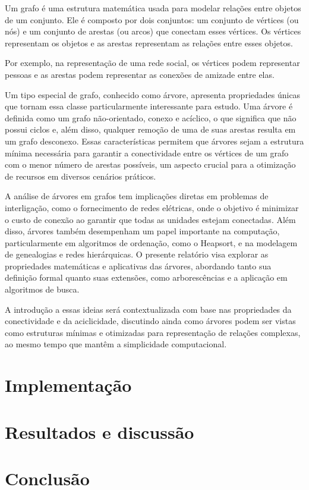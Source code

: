 \documentclass[12pt, a4paper]{scrreprt}
\begin{document}
Um grafo é uma estrutura matemática usada para modelar relações entre objetos de um conjunto. Ele é composto por dois conjuntos: um conjunto de vértices (ou nós) e um conjunto de arestas (ou arcos) que conectam esses vértices. Os vértices representam os objetos e as arestas representam as relações entre esses objetos.\cite{emilio2024grafos}

Por exemplo, na representação de uma rede social, os vértices podem representar pessoas e as arestas podem representar as conexões de amizade entre elas.

Um tipo especial de grafo, conhecido como árvore, apresenta propriedades únicas que tornam essa classe particularmente interessante para estudo. Uma árvore é definida como um grafo não-orientado, conexo e acíclico, o que significa que não possui ciclos e, além disso, qualquer remoção de uma de suas arestas resulta em um grafo desconexo. Essas características permitem que árvores sejam a estrutura mínima necessária para garantir a conectividade entre os vértices de um grafo com o menor número de arestas possíveis, um aspecto crucial para a otimização de recursos em diversos cenários práticos.

A análise de árvores em grafos tem implicações diretas em problemas de interligação, como o fornecimento de redes elétricas, onde o objetivo é minimizar o custo de conexão ao garantir que todas as unidades estejam conectadas. Além disso, árvores também desempenham um papel importante na computação, particularmente em algoritmos de ordenação, como o Heapsort, e na modelagem de genealogias e redes hierárquicas. O presente relatório visa explorar as propriedades matemáticas e aplicativas das árvores, abordando tanto sua definição formal quanto suas extensões, como arborescências e a aplicação em algoritmos de busca.

A introdução a essas ideias será contextualizada com base nas propriedades da conectividade e da aciclicidade, discutindo ainda como árvores podem ser vistas como estruturas mínimas e otimizadas para representação de relações complexas, ao mesmo tempo que mantêm a simplicidade computacional.

\chapter{Implementação}

\chapter{Resultados e discussão}

\chapter{Conclusão}


\printbibliography %
\end{document}
